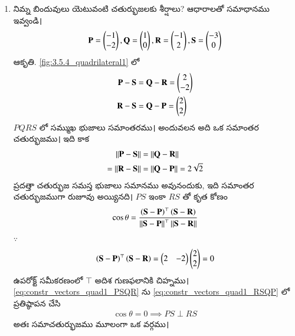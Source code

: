 %
\renewcommand{\theequation}{\theenumi}
\begin{enumerate}[label=\thesection.\arabic*.,ref=\thesection.\theenumi]


\item నిమ్న బిందువులు యెటువంటి చతుర్భుజలకు శీర్షాలు? ఆధారాలతో సమాధానము ఇవ్వండి।
\begin{align}
\mathbf{P} = \begin{pmatrix}-1\\-2\end{pmatrix}, \mathbf{Q} =\begin{pmatrix}1\\0\end{pmatrix},
\mathbf{R} =\begin{pmatrix}-1\\2\end{pmatrix}, \mathbf{S} =\begin{pmatrix}-3\\0\end{pmatrix}
\end{align}
\solution
ఆకృతి.	\ref{fig:3.5.4_quadrilateral1} లో
\begin{align}
\label{eq:constr_vectors_quad1_PSQR}
 \mathbf{P} - \mathbf{S} &= 
 \mathbf{Q} - \mathbf{R} = \begin{pmatrix}2\\-2\end{pmatrix}
\\
\mathbf {R} - \mathbf {S} &=
 \mathbf {Q} - \mathbf {P} = \begin{pmatrix}2\\2\end{pmatrix}
\label{eq:constr_vectors_quad1_RSQP}
\end{align}
%
$PQRS$ లో  సమ్ముఖ  భుజాలు సమాంతరము। అందువలన అది ఒక సమాంతర చతుర్భుజము। ఇది కాక 
\begin{align}
\left\lVert \mathbf{P} - \mathbf{S}\right\rVert &= 
\left\lVert \mathbf{Q} - \mathbf{R}\right\rVert 
\\
=\left\lVert\mathbf {R} - \mathbf {S}\right\rVert &=
\left\lVert \mathbf {Q} - \mathbf {P}\right\rVert = 2\sqrt{2}
\end{align}
%
 ప్రదత్తా చతుర్భుజ సమస్త భుజాలు సమానము అవునందుకు, ఇది సమాంతర చతుర్భుజముగా రుజూవు
అయ్యినది।   $PS$  ఇంకా 
$RS$  తో కృత కోణం
\begin{align}
\cos \theta = \frac{\left(\mathbf{S}-\mathbf{P}\right)^{\top}\left(\mathbf{S}-\mathbf{R}\right)}{\left\lVert\mathbf{S}-\mathbf{P}\right\rVert^{\top}\left\lVert\mathbf{S}-\mathbf{R}\right\rVert}
\end{align}
%
$\because $
\begin{align}
\left(\mathbf{S}-\mathbf{P}\right)^{\top}\left(\mathbf{S}-\mathbf{R}\right) = \begin{pmatrix}2 & -2\end{pmatrix}\begin{pmatrix}2\\2\end{pmatrix} = 0
\end{align}
ఉపరోక్ట్ సమీకరణంలో ${\top}$  అదిశ గుణఫలానికి  చిహ్నము। 
\eqref{eq:constr_vectors_quad1_PSQR} ను  \eqref{eq:constr_vectors_quad1_RSQP} లో  
ప్రతిష్ఠాపన చేసి 
\begin{align}
\cos \theta = 0 \implies PS \perp RS
\end{align}
%
అతః సమాచతుర్భుజము  మూలంగా ఒక వర్గము। 
\begin{figure}[!ht]
	\centering

\end{figure}
\end{enumerate}

